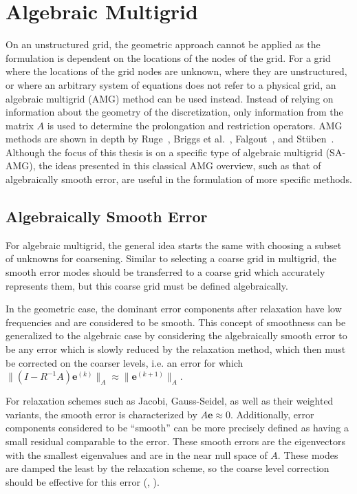 


\section{Algebraic Multigrid}


On an unstructured grid, the geometric approach cannot be applied as the formulation is dependent on the locations of the nodes of the grid. For a grid where the locations of the grid nodes are unknown, where they are unstructured, or where an arbitrary system of equations does not refer to a physical grid, an algebraic multigrid (AMG) method can be used instead. Instead of relying on information about the geometry of the discretization, only information from the matrix $A$ is used to determine the prolongation and restriction operators. AMG methods are shown in depth by Ruge~\cite{Ruge1987}, Briggs et al.~\cite{Briggs2000}, Falgout~\cite{Falgout2006}, and Stüben~\cite{Stuben1999}. Although the focus of this thesis is on a specific type of algebraic multigrid (SA-AMG), the ideas presented in this classical AMG overview, such as that of algebraically smooth error, are useful in the formulation of more specific methods.

\subsection{Algebraically Smooth Error}

For algebraic multigrid, the general idea starts the same with choosing a subset of unknowns for coarsening. Similar to selecting a coarse grid in multigrid, the smooth error modes should be transferred to a coarse grid which accurately represents them, but this coarse grid must be defined algebraically.

In the geometric case, the dominant error components after relaxation have low frequencies and are considered to be smooth. This concept of smoothness can be generalized to the algebraic case by considering the algebraically smooth error to be any error which is slowly reduced by the relaxation method, which then must be corrected on the coarser levels, i.e. an error for which $ \|(I - R^{-1}A)\mathbf{e}^{(k)}\|_A \approx \| \mathbf{e}^{(k+1)}\|_A $.

For relaxation schemes such as Jacobi, Gauss-Seidel, as well as their weighted variants, the smooth error is characterized by $ A\mathbf{e} \approx 0 $. Additionally, error components considered to be “smooth” can be more precisely defined as having a small residual comparable to the error. These smooth errors are the eigenvectors with the smallest eigenvalues and are in the near null space of $A$. These modes are damped the least by the relaxation scheme, so the coarse level correction should be effective for this error (\cite{Falgout2006}, \cite{Ruge1987}).

